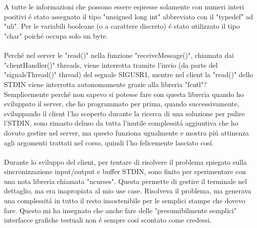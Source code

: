  \\
 \\
 A tutte le informazioni che possono essere espresse solamente con numeri interi positivi \'e stato assegnato il tipo "unsigned long int" abbreviato con il "typedef" ad "uli". Per le variabili booleane (o a carattere discreto) \'e stato utilizzato il tipo "char" poich\'e occupa solo un byte.
 \\
 \\
 Perch\'e nel server le "read()" nella funzione "receiveMessage()", chiamata dai "clientHandler()" threads, viene interrotta tramite l'invio (da parte del "signalsThread()" thread) del segnale SIGUSR1, mentre nel client la "read()" dello STDIN viene interrotta autonomamente grazie alla libreria "fcntl"? Semplicemente perch\'e non sapevo si potesse fare con questa libreria quando ho sviluppato il server, che ho programmato per prima, quando successivamente, sviluppando il client l'ho scoperto durante la ricerca di una soluzione per pulire l'STDIN, sono rimasto deluso da tutta l'inutile complessit\'a aggiuntiva che ho dovuto gestire nel server, ma questo funziona ugualmente e mostra pi\'u attinenza agli argomenti trattati nel corso, quindi l'ho felicemente lasciato cos\'i.
 \\
 \\
 Durante lo sviluppo del client, per tentare di risolvere il problema spiegato sulla sincronizzazione input/output e buffer STDIN, sono finito per sperimentare con una nota libreria chiamata "ncurses". Questa permette di gestire il terminale nel dettaglio, ma era inapropiata al mio use case. Risolveva il problema, ma generava una complessit\'a in tutto il resto insostenibile per le semplici stampe che dovevo fare. Questo mi ha insegnato che anche fare delle "presumibilmente semplici" interfacce grafiche testuali non \'e sempre cos\'i scontato come credessi.

\iffalse
\begin{figure}[H]
    \centering
    \texttt{[image: immagine.png]}
    \caption{Descrizione.}
\end{figure}
\fi

